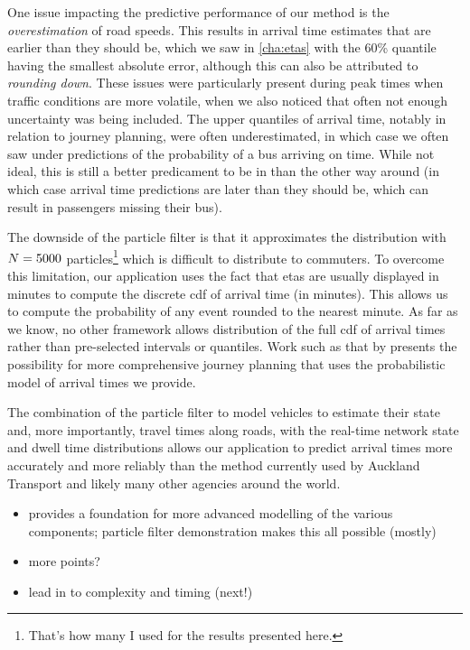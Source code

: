 One issue impacting the predictive performance of our method is the \emph{overestimation} of road speeds. This results in arrival time estimates that are earlier than they should be, which we saw in \cref{cha:etas} with the 60\% quantile having the smallest absolute error, although this can also be attributed to \emph{rounding down}. These issues were particularly present during peak times when traffic conditions are more volatile, when we also noticed that often not enough uncertainty was being included. The upper quantiles of arrival time, notably in relation to journey planning, were often underestimated, in which case we often saw under predictions of the probability of a bus arriving on time. While not ideal, this is still a better predicament to be in than the other way around (in which case arrival time predictions are later than they should be, which can result in passengers missing their bus).


The downside of the particle filter is that it approximates the distribution with $N=5000$ particles\footnote{That's how many I used for the results presented here.} which is difficult to distribute to commuters. To overcome this limitation, our application uses the fact that \glspl{eta} are usually displayed in minutes to compute the discrete \gls{cdf} of arrival time (in minutes). This allows us to compute the probability of any event rounded to the nearest minute. As far as we know, no other framework allows distribution of the full \gls{cdf} of arrival times rather than pre-selected intervals or quantiles. Work such as that by \citet{Celan_2017,Celan_2018} presents the possibility for more comprehensive journey planning that uses the probabilistic model of arrival times we provide.


The combination of the particle filter to model vehicles to estimate their state and, more importantly, travel times along roads, with the real-time network state and dwell time distributions allows our application to predict arrival times more accurately and more reliably than the method currently used by Auckland Transport and likely many other agencies around the world.
\begin{itemize}
  \item provides a foundation for more advanced modelling of the various components; particle filter demonstration makes this all possible (mostly)
  \item more points?
  \item lead in to complexity and timing (next!)
\end{itemize}



